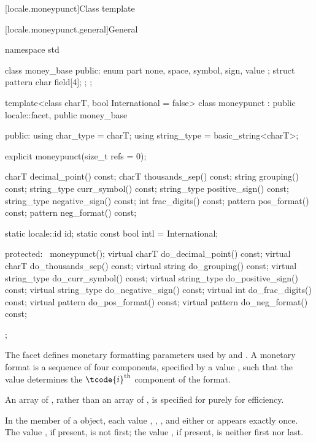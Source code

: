 [locale.moneypunct]{Class template }

[locale.moneypunct.general]{General}

%
\begin{codeblock}
namespace std {
  class money_base {
  public:
    enum part { none, space, symbol, sign, value };
    struct pattern { char field[4]; };
  };

  template<class charT, bool International = false>
    class moneypunct : public locale::facet, public money_base {
    public:
      using char_type   = charT;
      using string_type = basic_string<charT>;

      explicit moneypunct(size_t refs = 0);

      charT        decimal_point() const;
      charT        thousands_sep() const;
      string       grouping()      const;
      string_type  curr_symbol()   const;
      string_type  positive_sign() const;
      string_type  negative_sign() const;
      int          frac_digits()   const;
      pattern      pos_format()    const;
      pattern      neg_format()    const;

      static locale::id id;
      static const bool intl = International;

    protected:
      ~moneypunct();
      virtual charT        do_decimal_point() const;
      virtual charT        do_thousands_sep() const;
      virtual string       do_grouping()      const;
      virtual string_type  do_curr_symbol()   const;
      virtual string_type  do_positive_sign() const;
      virtual string_type  do_negative_sign() const;
      virtual int          do_frac_digits()   const;
      virtual pattern      do_pos_format()    const;
      virtual pattern      do_neg_format()    const;
    };
}
\end{codeblock}

\pnum
The  facet defines monetary formatting parameters
used by  and .
A monetary format is a sequence of four components,
specified by a  value ,
such that the  value 
determines the $\tcode{i}^\text{th}$ component of the format.
\begin{footnote}
An array of ,
rather than an array of ,
is specified for  purely for efficiency.
\end{footnote}
In the  member of a  object,
each value , , , and
either  or 
appears exactly once.
The value , if present, is not first;
the value , if present, is neither first nor last.

